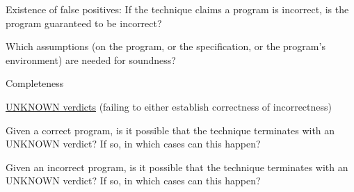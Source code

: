 \documentclass[a4paper]{article}
\begin{document}
\begin{minipage}[t]{0.16\linewidth}
\begin{betterlist}
\begin{betterlist}
\begin{betterlist}
				\item Existence of false positives: If the technique claims a program is incorrect, is the program guaranteed to be incorrect?

			\end{betterlist}
			\item Which assumptions (on the program, or the specification, or the program’s environment) are needed for soundness?
		\end{betterlist}
		\item \alert{Completeness}
		\begin{betterlist}
			\item \underline{UNKNOWN verdicts} (failing to either establish correctness of incorrectness)
			\begin{betterlist}
				\item Given a correct program, is it possible that the technique terminates with an UNKNOWN verdict? If so, in which cases can this happen?

				\item Given an incorrect program, is it possible that the technique terminates with an UNKNOWN verdict? If so, in which cases can this happen?


\end{betterlist}
\end{betterlist}
\end{betterlist}
\end{minipage}
\end{document}
